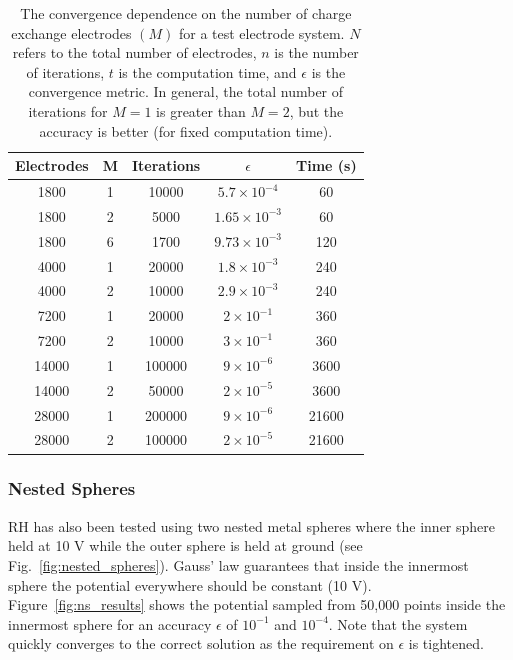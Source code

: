 \begin{table}[htdp]
\caption{The convergence dependence on the number of charge exchange electrodes $(M)$ for a test electrode system.  $N$ refers to the total number of electrodes, $n$ is the number of iterations, $t$ is the computation time, and $\epsilon$ is the convergence metric.  In general, the total number of iterations for $M=1$ is greater than $M=2$, but the accuracy is better (for fixed computation time).}
\begin{center}
\begin{tabular}{|c|c|c|c|c|}
\hline
Electrodes & M & Iterations & $\epsilon$ & Time (s) \\ 
\hline
1800 & 1 & 10000 & $5.7 \times 10^{-4}$ & 60 \\
1800 & 2 & 5000 & $1.65 \times 10^{-3}$ & 60 \\
1800 & 6 & 1700 & $9.73\times 10^{-3}$ & 120 \\
\hline
4000 & 1 & 20000 & $1.8 \times 10^{-3}$ & 240 \\
4000 & 2 & 10000 & $2.9 \times 10^{-3}$ & 240 \\
\hline
7200 & 1 & 20000 & $2\times 10^{-1}$ & 360 \\
7200 & 2 & 10000 & $3 \times 10^{-1}$ & 360 \\
\hline
14000 & 1 & 100000 & $9\times 10^{-6}$ & 3600 \\
14000 & 2 & 50000 & $2 \times 10^{-5}$ & 3600 \\
\hline
28000 & 1 & 200000 & $9\times 10^{-6}$ & 21600 \\
28000 & 2 & 100000 & $2 \times 10^{-5}$ & 21600 \\
\hline
\end{tabular}
\end{center}
\label{tab:M}
\end{table}%


\subsubsection{Nested Spheres}

RH has also been tested using two nested metal spheres where the inner sphere held at 10 V while the outer sphere is held at ground (see Fig.~\ref{fig:nested_spheres}).  Gauss' law guarantees that inside the innermost sphere the potential everywhere should be constant (10 V).  Figure~\ref{fig:ns_results} shows the potential sampled from 50,000 points inside the innermost sphere for an accuracy $\epsilon$ of $10^{-1}$ and $10^{-4}$.  Note that the system quickly converges to the correct solution as the requirement on $\epsilon$ is tightened.

